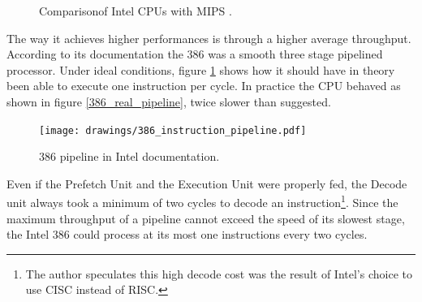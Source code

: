\par
\begin{figure}[H]
\centering
   \caption{Comparison\protect\footnotemark of Intel CPUs with MIPS \protect\footnotemark.}
 \end{figure}

The way it achieves higher performances is through a higher average throughput. According to its documentation the 386 was a smooth three stage pipelined processor. Under ideal conditions, figure \ref{386_doc_pipeline} shows how it should have in theory been able to execute one instruction per cycle. In practice the CPU behaved as shown in figure \ref{386_real_pipeline}, twice slower than suggested.

\begin{figure}[H]
\centering
\texttt{[image: drawings/386\_instruction\_pipeline.pdf]}
\caption{386 pipeline in Intel documentation.}
\label{386_doc_pipeline}
\end{figure}



\par
Even if the Prefetch Unit and the Execution Unit were properly fed, the Decode unit always took a minimum of two cycles to decode an instruction\footnote{The author speculates this high decode cost was the result of Intel's choice to use CISC instead of RISC.}. Since the maximum throughput of a pipeline cannot exceed the speed of its slowest stage, the Intel 386 could process at its most one instructions every two cycles.\\
\par

